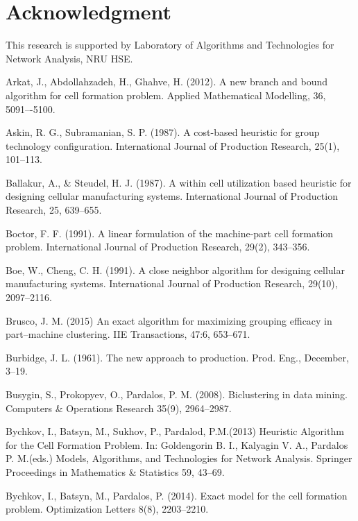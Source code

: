 \documentclass[citeauthoryear]{llncs}
\begin{document}
\section{Acknowledgment}
This research is supported by Laboratory of Algorithms and Technologies for Network Analysis, NRU HSE.

\begin{thebibliography}{99}

 Arkat, J., Abdollahzadeh, H., Ghahve, H. (2012). A new branch and bound algorithm for cell formation problem. Applied Mathematical Modelling, 36, 5091–-5100.
    
 Askin, R. G., Subramanian, S. P. (1987). A cost-based heuristic for group technology configuration. International Journal of Production Research, 25(1), 101--113.

 Ballakur, A., \& Steudel, H. J. (1987). A within cell utilization based heuristic for designing cellular manufacturing systems. International Journal of Production Research, 25, 639--655.

 Boctor, F. F. (1991). A linear formulation of the machine-part cell formation problem. International Journal of Production Research, 29(2), 343--356.

 Boe, W., Cheng, C. H. (1991). A close neighbor algorithm for designing cellular manufacturing systems. International Journal of Production Research, 29(10), 2097--2116.

 Brusco, J. M. (2015) An exact algorithm for maximizing grouping efficacy in part–machine clustering. IIE Transactions, 47:6, 653--671.
    
 Burbidge, J. L. (1961). The new approach to production. Prod. Eng., December, 3--19.

 Busygin, S., Prokopyev, O., Pardalos, P. M. (2008). Biclustering in data mining. Computers \& Operations Research 35(9), 2964--2987.

 Bychkov, I., Batsyn, M., Sukhov, P., Pardalod, P.M.(2013) Heuristic Algorithm for the Cell Formation Problem. In: Goldengorin B. I., Kalyagin V. A., Pardalos P. M.(eds.) Models, Algorithms, and Technologies for Network Analysis. Springer Proceedings in Mathematics \& Statistics 59, 43--69.

 Bychkov, I., Batsyn, M., Pardalos, P. (2014). Exact model for the cell formation problem. Optimization Letters 8(8), 2203--2210.


\end{thebibliography}
\end{document}

